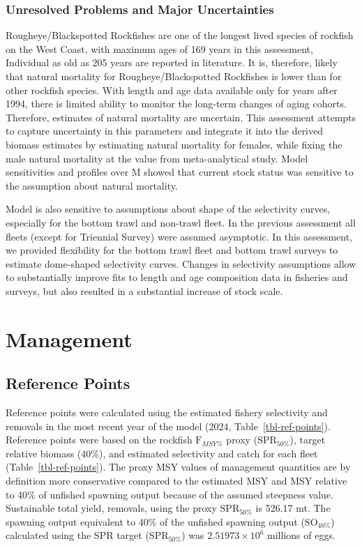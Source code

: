 \documentclass[
]{scrartcl}
\begin{document}
\subsubsection{Unresolved Problems and Major
Uncertainties}\label{unresolved-problems-and-major-uncertainties-1}

Rougheye/Blackspotted Rockfishes are one of the longest lived species of
rockfish on the West Coast, with maximum ages of 169 years in this
assessment, Individual as old as 205 years are reported in literature.
It is, therefore, likely that natural mortality for
Rougheye/Blackspotted Rockfishes is lower than for other rockfish
species. With length and age data available only for years after 1994,
there is limited ability to monitor the long-term changes of aging
cohorts. Therefore, estimates of natural mortality are uncertain. This
assessment attempts to capture uncertainty in this parameters and
integrate it into the derived biomass estimates by estimating natural
mortality for females, while fixing the male natural mortality at the
value from meta-analytical study. Model sensitivities and profiles over
M showed that current stock status was sensitive to the assumption about
natural mortality.

Model is also sensitive to assumptions about shape of the selectivity
curves, especially for the bottom trawl and non-trawl fleet. In the
previous assessment all fleets (except for Triennial Survey) were
assumed asymptotic. In this assessment, we provided flexibility for the
bottom trawl fleet and bottom trawl surveys to estimate dome-shaped
selectivity curves. Changes in selectivity assumptions allow to
substantially improve fits to length and age composition data in
fisheries and surveys, but also resulted in a substantial increase of
stock scale.

\newpage{}

\section{Management}\label{management}

\subsection{Reference Points}\label{reference-points-1}

Reference points were calculated using the estimated fishery selectivity
and removals in the most recent year of the model (2024,
Table~\ref{tbl-ref-points}). Reference points were based on the rockfish
\(\text{F}_{MSY\%}\) proxy (\(\text{SPR}_{50\%}\)), target relative
biomass (40\%), and estimated selectivity and catch for each fleet
(Table~\ref{tbl-ref-points}). The proxy MSY values of management
quantities are by definition more conservative compared to the estimated
MSY and MSY relative to 40\% of unfished spawning output because of the
assumed steepness value. Sustainable total yield, removals, using the
proxy \(\text{SPR}_{50\%}\) is 526.17 mt. The spawning output equivalent
to 40\% of the unfished spawning output (\(\text{SO}_{40\%}\))
calculated using the SPR target (\(\text{SPR}_{50\%}\)) was
\ensuremath{2.51973\times 10^{6}} millions of eggs.
\end{document}
